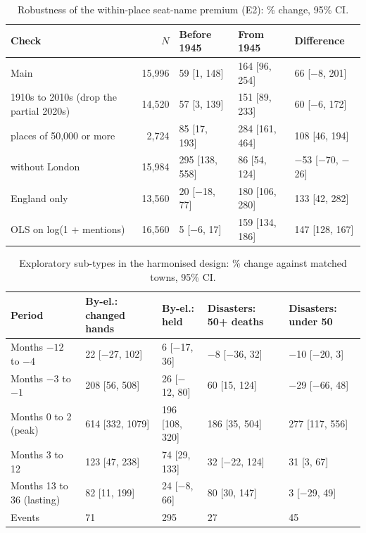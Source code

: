 \documentclass[11pt,a4paper]{article}
\begin{document}
\begin{table}[tbp]\centering\footnotesize\caption{Robustness of the within-place seat-name premium (E2): \% change, 95\% CI.}\label{tab:seatrob}\setlength{\tabcolsep}{4pt}\begin{tabular}{lrlll}\toprule Check & $N$ & Before 1945 & From 1945 & Difference\\\midrule
Main & 15,996 & 59 [1, 148] & 164 [96, 254] & 66 [$-$8, 201]\\
1910s to 2010s (drop the partial 2020s) & 14,520 & 57 [3, 139] & 151 [89, 233] & 60 [$-$6, 172]\\
places of 50,000 or more & 2,724 & 85 [17, 193] & 284 [161, 464] & 108 [46, 194]\\
without London & 15,984 & 295 [138, 558] & 86 [54, 124] & $-$53 [$-$70, $-$26]\\
England only & 13,560 & 20 [$-$18, 77] & 180 [106, 280] & 133 [42, 282]\\
OLS on log(1 + mentions) & 16,560 & 5 [$-$6, 17] & 159 [134, 186] & 147 [128, 167]\\
\bottomrule\end{tabular}\end{table}

\begin{table}[tbp]\centering\scriptsize\caption{Exploratory sub-types in the harmonised design: \% change against matched towns, 95\% CI.}\label{tab:sub}\setlength{\tabcolsep}{3pt}\begin{tabular}{p{3.2cm}llll}\toprule Period & By-el.: changed hands & By-el.: held & Disasters: 50+ deaths & Disasters: under 50\\\midrule
Months $-12$ to $-4$ & 22 [$-$27, 102] & 6 [$-$17, 36] & $-$8 [$-$36, 32] & $-$10 [$-$20, 3]\\
Months $-3$ to $-1$ & 208 [56, 508] & 26 [$-$12, 80] & 60 [15, 124] & $-$29 [$-$66, 48]\\
Months 0 to 2 (peak) & 614 [332, 1079] & 196 [108, 320] & 186 [35, 504] & 277 [117, 556]\\
Months 3 to 12 & 123 [47, 238] & 74 [29, 133] & 32 [$-$22, 124] & 31 [3, 67]\\
Months 13 to 36 (lasting) & 82 [11, 199] & 24 [$-$8, 66] & 80 [30, 147] & 3 [$-$29, 49]\\
Events & 71 & 295 & 27 & 45\\
\bottomrule\end{tabular}\end{table}
\end{document}

